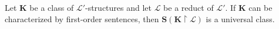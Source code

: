 Let $\mathbf{K}$ be a class of $\mathcal{L}'$-structures and let $\mathcal{L}$ be a reduct of $\mathcal{L}'$. If $\mathbf{K}$ can be characterized by first-order sentences, then $\mathbf{S}(\mathbf{K} \upharpoonright \mathcal{L})$ is a universal class.
